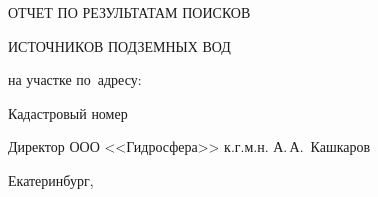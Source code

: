 

\setlength{\extrarowheight}{1mm} %


\begin{titlepage}
	\begin{center}
		\textbf{\txtExecutor}
		\vspace{7.5cm}
		
		{\LARGE ОТЧЕТ ПО РЕЗУЛЬТАТАМ ПОИСКОВ}

		\bigskip

		{\LARGE ИСТОЧНИКОВ ПОДЗЕМНЫХ ВОД}
		
		\bigskip
		
		на участке по~адресу:
		\bigskip
				
		\underline{\txtAddress}
		
		\bigskip
		Кадастровый номер \txtCadaster
		
		\vfill
	
		\bigskip
		
	\end{center}

	\vfill
	
	\newlength{\ML}
	\hfill
	\begin{minipage}{1.0\textwidth}
		Директор ООО <<Гидросфера>> к.г.м.н.
		\underline{\hspace{\ML}} А.\,А.~Кашкаров\\
	\end{minipage}%
	
	\bigskip
	
	\vfill
	\begin{center}
		Екатеринбург, \txtYear
	\end{center}			

	\end{titlepage}

\tableofcontents

\listoffigures


\bigskip


